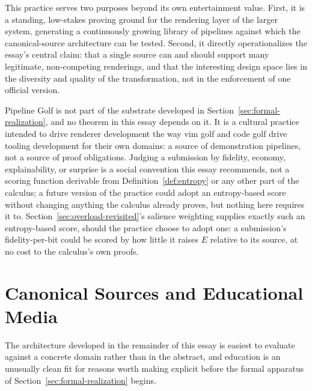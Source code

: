 \documentclass[11pt]{article}
\theoremstyle{definition}
\begin{document}
This practice serves two purposes beyond its own entertainment value. First, it is a standing, low-stakes proving ground for the rendering layer of the larger system, generating a continuously growing library of pipelines against which the canonical-source architecture can be tested. Second, it directly operationalizes the essay's central claim: that a single source can and should support many legitimate, non-competing renderings, and that the interesting design space lies in the diversity and quality of the transformation, not in the enforcement of one official version.

Pipeline Golf is not part of the substrate developed in Section~\ref{sec:formal-realization}, and no theorem in this essay depends on it. It is a cultural practice intended to drive renderer development the way vim golf and code golf drive tooling development for their own domains: a source of demonstration pipelines, not a source of proof obligations. Judging a submission by fidelity, economy, explainability, or surprise is a social convention this essay recommends, not a scoring function derivable from Definition~\ref{def:entropy} or any other part of the calculus; a future version of the practice could adopt an entropy-based score without changing anything the calculus already proves, but nothing here requires it to. Section~\ref{sec:overload-revisited}'s salience weighting supplies exactly such an entropy-based score, should the practice choose to adopt one: a submission's fidelity-per-bit could be scored by how little it raises $E$ relative to its source, at no cost to the calculus's own proofs.

\section{Canonical Sources and Educational Media}
\label{sec:educational-media}

The architecture developed in the remainder of this essay is easiest to evaluate against a concrete domain rather than in the abstract, and education is an unusually clean fit for reasons worth making explicit before the formal apparatus of Section~\ref{sec:formal-realization} begins.
\end{document}
